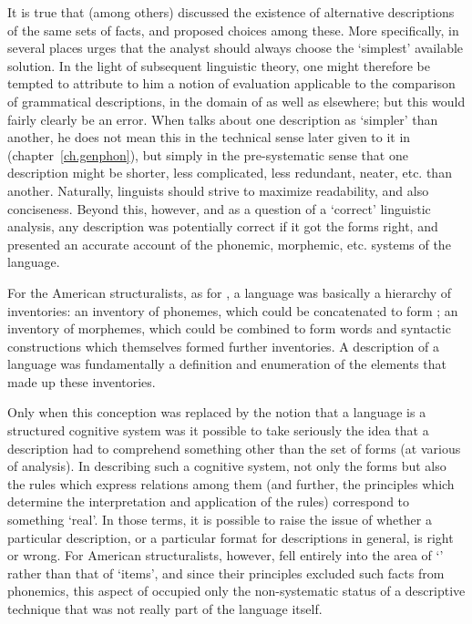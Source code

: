 It is true that {\Bloomfield} (among others) discussed the existence of
alternative descriptions of the same sets of facts, and proposed
choices among these. More specifically, {\Bloomfield} in several places
urges that the analyst should always choose the `simplest' available
solution. In the light of subsequent linguistic theory, one might
therefore be tempted to attribute to him a notion of evaluation
applicable to the comparison of grammatical descriptions, in the
domain of  as well as elsewhere; but this would fairly
clearly be an error. When {\Bloomfield} talks about one description as
`simpler' than another, he does not mean this in the technical sense
later given to it in  (chapter~\ref{ch.genphon}), but
simply in the pre-systematic sense that one description might be
shorter, less complicated, less redundant, neater, etc. than
another. Naturally, linguists should strive to maximize readability,
and also conciseness. Beyond this, however, and as a question of a
`correct' linguistic analysis, any description was potentially correct
if it got the forms right, and presented an accurate account of the
phonemic, morphemic, etc. systems of the language.

For the American structuralists, as for {\Bloomfield}, a language was
basically a hierarchy of inventories: an inventory of phonemes, which
could be concatenated to form ; an inventory of
morphemes, which could be combined to form words and syntactic
constructions which themselves formed further inventories. A
description of a language was fundamentally a definition and
enumeration of the elements that made up these inventories.

Only when this conception was replaced by the notion that a language
is a structured cognitive system was it possible to take seriously the
idea that a description had to comprehend something other than the set
of forms (at various  of analysis). In describing such a
cognitive system, not only the forms but also the rules which express
 relations among them (and further, the principles which
determine the interpretation and application of the rules) correspond
to something `real'. In those terms, it is possible to raise the issue
of whether a particular description, or a particular format for
descriptions in general, is right or wrong. For American
structuralists, however,  fell entirely into the area
of `' rather than that of `items', and since their
principles excluded such facts from phonemics, this aspect of
 occupied only the non-systematic status of a
descriptive technique that was not really part of the language itself.


